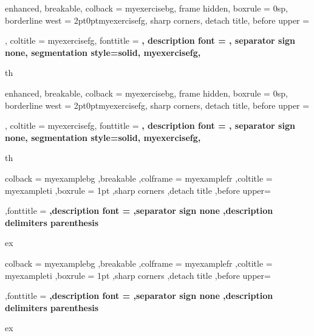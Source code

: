 
 
{%
enhanced, breakable, colback = myexercisebg, frame hidden, boxrule = 0sp, borderline west = {2pt}{0pt}{myexercisefg}, sharp corners, detach title, before upper = \tcbtitle\par\smallskip, coltitle = myexercisefg, fonttitle = \bfseries\sffamily, description font = \mdseries, separator sign none, segmentation style={solid, myexercisefg}, }
{th}

 
{%
enhanced, breakable, colback = myexercisebg, frame hidden, boxrule = 0sp, borderline west = {2pt}{0pt}{myexercisefg}, sharp corners, detach title, before upper = \tcbtitle\par\smallskip, coltitle = myexercisefg, fonttitle = \bfseries\sffamily, description font = \mdseries, separator sign none, segmentation style={solid, myexercisefg}, } {th}


 {%
colback = myexamplebg ,breakable ,colframe = myexamplefr ,coltitle = myexampleti ,boxrule = 1pt ,sharp corners ,detach title ,before upper=\tcbtitle\par\smallskip ,fonttitle = \bfseries ,description font = \mdseries ,separator sign none ,description delimiters parenthesis }
{ex}

 {%
colback = myexamplebg ,breakable ,colframe = myexamplefr ,coltitle = myexampleti ,boxrule = 1pt ,sharp corners ,detach title ,before upper=\tcbtitle\par\smallskip ,fonttitle = \bfseries ,description font = \mdseries ,separator sign none ,description delimiters parenthesis }
{ex}


